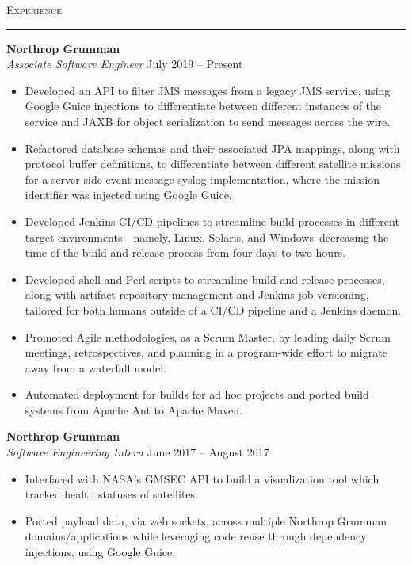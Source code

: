 \documentclass{res}
\begin{document}
\begin{resume}
\textsc{{\Large Experience}}
\vspace{0.5mm}
\hrule width18.5cm
\textbf{Northrop Grumman}\\
\textit{Associate Software Engineer}
\hfill
July 2019 -- Present\\[1mm]
	\begin{itemize}
		\vspace{-3mm}
    \item Developed an API to filter JMS messages from a legacy JMS service, using Google Guice injections to differentiate between different instances of the service and JAXB for object serialization to send messages across the wire.
    \item Refactored database schemas and their associated JPA mappings, along with protocol buffer definitions, to differentiate between different satellite missions for a server-side event message syslog implementation, where the mission identifier was injected using Google Guice.
    \item Developed Jenkins CI/CD pipelines to streamline build processes in different target environments--–namely, Linux, Solaris, and Windows--decreasing the time of the build and release process from four days to two hours.
    \item Developed shell and Perl scripts to streamline build and release processes, along with artifact repository management and Jenkins job versioning, tailored for both humans outside of a CI/CD pipeline and a Jenkins daemon.
    \item Promoted Agile methodologies, as a Scrum Master, by leading daily Scrum meetings, retrospectives, and planning in a program-wide effort to migrate away from a waterfall model.
    \item Automated deployment for builds for ad hoc projects and ported build systems from Apache Ant to Apache Maven.
  \end{itemize}
\textbf{Northrop Grumman}\\
\textit{Software Engineering Intern}
\hfill
June 2017 -- August 2017\\[1mm]
	\begin{itemize}
		\vspace{-3mm}
  \item Interfaced with NASA's GMSEC API to build a visualization tool which tracked health statuses of satellites.
  \item Ported payload data, via web sockets, across multiple Northrop Grumman domains/applications while leveraging code reuse through dependency injections, using Google Guice.

\end{itemize}
\end{resume}
\end{document}
